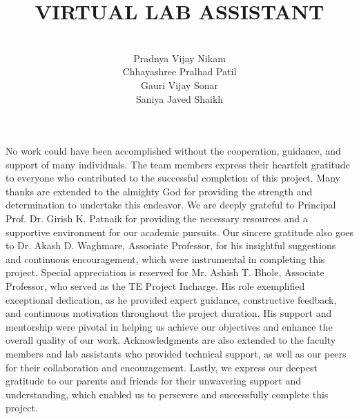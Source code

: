 \documentclass{SSBT-BE}
\begin{document}
\title {VIRTUAL LAB ASSISTANT }
\author{\\ Pradnya Vijay Nikam 
        \\ Chhayashree Pralhad Patil
       \\ Gauri Vijay Sonar
       \\Saniya Javed Shaikh
       }

\beforepreface 

\afterpreface
\listoffigures
\newpage
\listoftables
\newpage
%
\clearpage
{}
\pagestyle{plain}

%
No work could have been accomplished without the cooperation, guidance, and support of many individuals. The team members express their heartfelt gratitude to everyone who contributed to the successful completion of this project. Many thanks are extended to the almighty God for providing the strength and determination to undertake this endeavor.
We are deeply grateful to Principal Prof. Dr. Girish K. Patnaik for providing the necessary resources and a supportive environment for our academic pursuits. Our sincere gratitude also goes to Dr. Akash D. Waghmare, Associate Professor, for his insightful suggestions and continuous encouragement, which were instrumental in completing this project.
Special appreciation is reserved for Mr. Ashish T. Bhole, Associate Professor, who served as the TE Project Incharge. His role exemplified exceptional dedication, as he provided expert guidance, constructive feedback, and continuous motivation throughout the project duration. His support and mentorship were pivotal in helping us achieve our objectives and enhance the overall quality of our work.
Acknowledgments are also extended to the faculty members and lab assistants who provided technical support, as well as our peers for their collaboration and encouragement. Lastly, we express our deepest gratitude to our parents and friends for their unwavering support and understanding, which enabled us to persevere and successfully complete this project.





\acknowledgeauthor

  \makeindex
 
\end{document}
